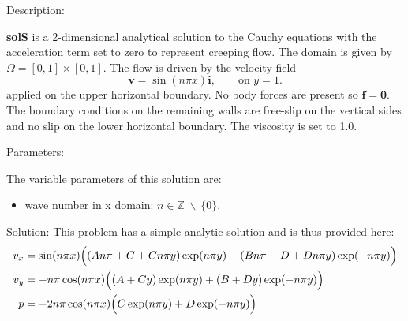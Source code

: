   {\large \fontB Description:}
  
  {\bf solS} is a 2-dimensional analytical solution to the Cauchy equations with the acceleration term set to zero to represent creeping flow. The domain is given by $\Omega = [0,1] \times [0,1]$.
  The flow is driven by the velocity field
  \begin{equation}
    \boldsymbol v = \sin (n \pi x ) \boldsymbol i,
    \qquad \mbox{on $y = 1$}.
  \end{equation}
  applied on the upper horizontal boundary. No body forces are present so $\boldsymbol f = \boldsymbol 0$.
  The boundary conditions on the remaining walls are free-slip on the vertical sides and no slip on the lower horizontal boundary. 
  The viscosity is set to 1.0.

 {\large \fontB Parameters:}
  
 The variable parameters of this solution are:
 \begin{itemize}
   \item{wave number in x domain: $n \in \mathbb{Z} \medspace \backslash \medspace \{0\}$.}
 \end{itemize}

  
 {\large \fontB Solution:}
This problem has a simple analytic solution and is thus provided here:
\begin{align}
	v_x &= \sin( n \pi x ) 
		\Bigl( 
			( A n \pi + C + C n \pi y) \exp( n \pi y ) 
			- ( B n \pi - D + D n \pi y ) \exp( - n \pi y )
		 \Bigr)	\\
%
	v_y &= - n \pi \cos( n \pi x )
		\Bigl( 
  			( A + C y ) \exp( n \pi y ) 
			+ ( B + D y ) \exp( - n \pi y ) 
		\Bigr)	\\
%
	p &= - 2 n \pi \cos( n \pi x ) \Bigl( C \exp( n \pi y ) + D \exp( - n \pi y ) \Bigr)
\end{align}

